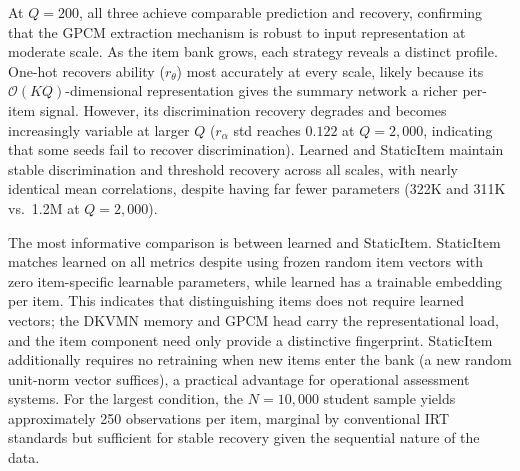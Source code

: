 \documentclass[pdflatex,sn-apa]{sn-jnl}
\begin{document}
At $Q=200$, all three achieve comparable prediction and recovery, confirming that the GPCM extraction mechanism is robust to input representation at moderate scale. As the item bank grows, each strategy reveals a distinct profile. One-hot recovers ability ($r_\theta$) most accurately at every scale, likely because its $\mathcal{O}(KQ)$-dimensional representation gives the summary network a richer per-item signal. However, its discrimination recovery degrades and becomes increasingly variable at larger $Q$ ($r_\alpha$ std reaches $0.122$ at $Q=2{,}000$, indicating that some seeds fail to recover discrimination). Learned and StaticItem maintain stable discrimination and threshold recovery across all scales, with nearly identical mean correlations, despite having far fewer parameters (322K and 311K vs.\ 1.2M at $Q=2{,}000$).

The most informative comparison is between learned and StaticItem. StaticItem matches learned on all metrics despite using frozen random item vectors with zero item-specific learnable parameters, while learned has a trainable embedding per item. This indicates that distinguishing items does not require learned vectors; the DKVMN memory and GPCM head carry the representational load, and the item component need only provide a distinctive fingerprint. StaticItem additionally requires no retraining when new items enter the bank (a new random unit-norm vector suffices), a practical advantage for operational assessment systems. For the largest condition, the $N=10{,}000$ student sample yields approximately 250 observations per item, marginal by conventional IRT standards \citep{de_ayala_theory_2009} but sufficient for stable recovery given the sequential nature of the data.
\end{document}
